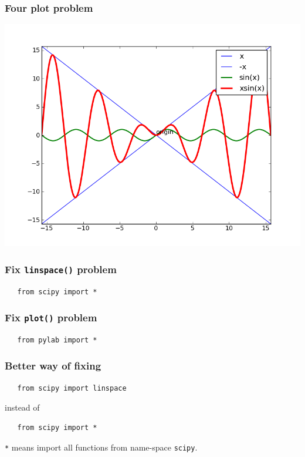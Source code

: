 \documentclass[presentation]{beamer}
\begin{document}
\begin{frame}
\frametitle{Four plot problem}
\label{sec-4}

    \begin{center}
      \includegraphics[scale=0.4]{four_plot}    
    \end{center}
\end{frame}
\begin{frame}[fragile]
\frametitle{Fix \texttt{linspace()} problem}
\label{sec-5}

\begin{verbatim}
   from scipy import *
\end{verbatim}
\end{frame}
\begin{frame}[fragile]
\frametitle{Fix \texttt{plot()} problem}
\label{sec-6}

\begin{verbatim}
   from pylab import *
\end{verbatim}
\end{frame}
\begin{frame}[fragile]
\frametitle{Better way of fixing}
\label{sec-7}

\begin{verbatim}
   from scipy import linspace
\end{verbatim}

  instead of
\begin{verbatim}
   from scipy import *
\end{verbatim}

    \texttt{*} means import all functions from name-space \texttt{scipy}.
\end{frame}
\end{document}
